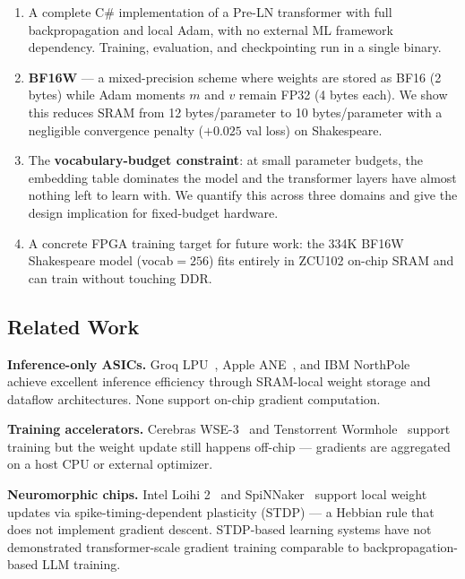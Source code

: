 \documentclass[11pt]{article}
\newcommand{\bfsixteenloss}{0.025}
\begin{document}
\begin{enumerate}
  \item A complete C\# implementation of a Pre-LN transformer with full backpropagation
    and local Adam, with no external ML framework dependency.
    Training, evaluation, and checkpointing run in a single binary.

  \item \textbf{BF16W} --- a mixed-precision scheme where weights are stored as BF16
    (2 bytes) while Adam moments $m$ and $v$ remain FP32 (4 bytes each). We show this
    reduces SRAM from 12 bytes/parameter to 10 bytes/parameter with a negligible
    convergence penalty ($+\bfsixteenloss$ val loss) on Shakespeare.

  \item The \textbf{vocabulary-budget constraint}: at small parameter budgets, the
    embedding table dominates the model and the transformer layers have almost nothing
    left to learn with. We quantify this across three domains and give the design
    implication for fixed-budget hardware.

  \item A concrete FPGA training target for future work: the 334K BF16W Shakespeare model
    (vocab$=256$) fits entirely in ZCU102 on-chip SRAM and can train without touching DDR.
\end{enumerate}

\subsection{Related Work}

\textbf{Inference-only ASICs.}
Groq LPU~\cite{groq}, Apple ANE~\cite{apple_ane}, and IBM NorthPole~\cite{ibm_northpole}
achieve excellent inference efficiency through SRAM-local weight storage and dataflow
architectures. None support on-chip gradient computation.

\textbf{Training accelerators.}
Cerebras WSE-3~\cite{cerebras} and Tenstorrent Wormhole~\cite{tenstorrent} support
training but the weight update still happens off-chip --- gradients are aggregated
on a host CPU or external optimizer.

\textbf{Neuromorphic chips.}
Intel Loihi 2~\cite{loihi2} and SpiNNaker~\cite{spinnaker} support local weight updates
via spike-timing-dependent plasticity (STDP) --- a Hebbian rule that does not implement
gradient descent. STDP-based learning systems have not demonstrated transformer-scale
gradient training comparable to backpropagation-based LLM training.
\end{document}
